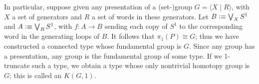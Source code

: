 \documentclass[hott-all.tex]{subfiles}
\begin{document}
% 
% 
\begin{eg}
  In particular, suppose given any presentation of a (set-)group $G = \langle X \mid R \rangle$, with $X$ a set of generators and $R$ a set of words in these generators.
  Let $B\vcentcolon\equiv \bigvee_X S^1$ and $A\vcentcolon\equiv \bigvee_R S^1$, with $f:A\to B$ sending each copy of $S^1$ to the corresponding word in the generating loops of $B$.
  It follows that $\pi_1(P) \cong G$; thus we have constructed a connected type whose fundamental group is $G$.
  Since any group has a presentation, any group is the fundamental group of some type.
  If we 1-truncate such a type, we obtain a type whose only nontrivial homotopy group is $G$; this is called an  $K(G,1)$.%
\end{eg}
% 
% 
% 
\end{document}
